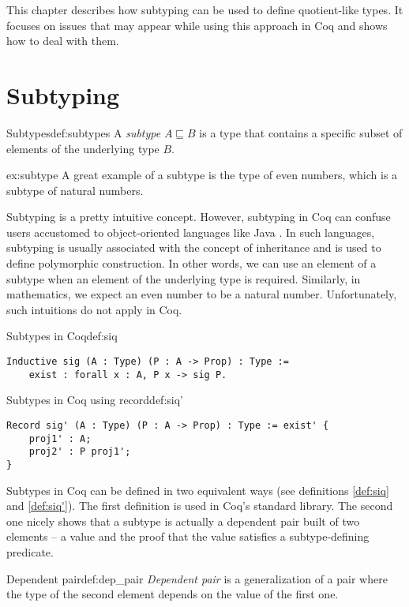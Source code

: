 This chapter describes how subtyping can be used to define quotient-like types. It focuses on issues that may appear while using this approach in Coq and shows how to deal with them.
\section{Subtyping}
\begin{defi}{Subtypes}{def:subtypes}
A \emph{subtype} $A \sqsubseteq B$ is a type that contains a specific subset of elements of the underlying type $B$.
\end{defi}
\begin{example}{}{ex:subtype}
A great example of a subtype is the type of even numbers, which is a subtype of natural numbers.
\end{example}
Subtyping is a pretty intuitive concept. However, subtyping in Coq can confuse users accustomed to object-oriented languages like Java \cite{Java}. In such languages, subtyping is usually associated with the concept of inheritance and is used to define polymorphic construction. In other words, we can use an element of a subtype when an element of the underlying type is required. Similarly, in mathematics, we expect an even number to be a natural number. Unfortunately, such intuitions do not apply in Coq.
\begin{defi}{Subtypes in Coq}{def:siq}
\begin{verbatim}
Inductive sig (A : Type) (P : A -> Prop) : Type :=
    exist : forall x : A, P x -> sig P.
\end{verbatim}
\end{defi}
\begin{defi}{Subtypes in Coq using record}{def:siq'}
\begin{verbatim}
Record sig' (A : Type) (P : A -> Prop) : Type := exist' {
    proj1' : A;
    proj2' : P proj1';
}
\end{verbatim}
\end{defi}
Subtypes in Coq can be defined in two equivalent ways (see definitions \ref{def:siq} and \ref{def:siq'}). The first definition is used in Coq's standard library. The second one nicely shows that a subtype is actually a dependent pair built of two elements -- a value and the proof that the value satisfies a subtype-defining predicate.
\begin{defi}{Dependent pair}{def:dep_pair}
\emph{Dependent pair} is a generalization of a pair where the type of the second element depends on the value of the first one.
\end{defi}
